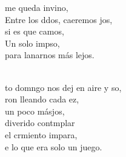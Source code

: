 \begin{cancion}
	me queda invino,\\
	Entre los ddos, caeremos jos, \\
	si es que camos,\\
	Un solo impso, \\
	para lanarnos más lejos.\\\jump\\
	\begin{chorus}%
	to domngo nos dej en aire y so, \\
	ron lleando cada ez, \\
	un poco másjos,\\
	 diverido contmplar  \\
	el crmiento impara,\\
	e lo que era solo un juego.\\
	\end{chorus}%
	\jump\\
	   \\
\end{cancion}%
